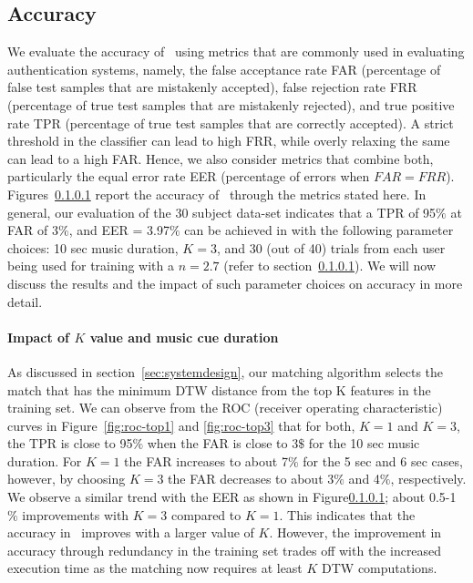 \subsection{Accuracy}
We evaluate the accuracy of \systemname~using metrics that are commonly used 
in evaluating authentication systems, namely,
the false acceptance rate FAR (percentage of false test samples that are 
mistakenly accepted), false rejection rate FRR (percentage of true test 
samples that are mistakenly rejected), and true positive rate 
TPR (percentage of true test samples that are correctly accepted). 
A strict threshold in the classifier can lead to high FRR, while 
overly relaxing the same can lead to a high FAR. Hence, we also consider 
metrics that combine both, particularly the equal error rate EER (percentage 
of errors when $FAR = FRR$).
Figures~\ref{} report the accuracy of \systemname~through the metrics stated 
here. In general, our evaluation of the 30 subject data-set indicates that a 
TPR of 95$\%$ at FAR of 3$\%$, and EER = 3.97$\%$ can be achieved in 
\systemname with the following parameter choices:
10 sec music duration, $K = 3$, and 30 (out of 40) trials from each user being 
used for training with a $n=2.7$ (refer to section~\ref{}). 
We will now discuss the results and the impact of such parameter choices 
on accuracy in more detail.

\paragraph{Impact of $K$ value and music cue duration}
As discussed in section~\ref{sec:systemdesign}, our matching algorithm 
selects the match that has the minimum DTW distance from the top K 
features in the training set. We can observe from the ROC 
(receiver operating characteristic) curves in Figure~\ref{fig:roc-top1} and \ref{fig:roc-top3} that 
for both, $K=1$ and $K=3$, the TPR is close to 95$\%$ when the FAR is close to 
3$\$$ for the 10 sec music duration. For $K=1$ the FAR increases to 
about 7$\%$ for the 5 sec and 6 sec cases, however, by choosing $K=3$ the FAR 
decreases to about 3$\%$ and 4$\%$, respectively. 
We observe a similar trend with the EER as shown in Figure\ref{}; about 
0.5-1$\%$ improvements with $K=3$ compared to $K=1$.
This indicates that the accuracy in \systemname~improves with a larger value 
of $K$. However, the improvement in accuracy through redundancy in the 
training set trades off with the increased execution time as the 
matching now requires at least $K$ DTW computations. 

